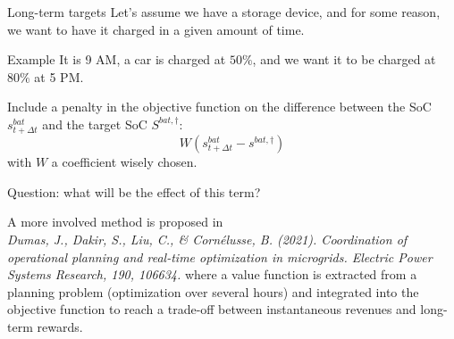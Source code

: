 \begin{frame}[allowframebreaks]{Long-term targets}
    Let's assume we have a storage device, and for some reason, we want to have it charged in a given amount of time.
    \begin{block}{Example}
        It is 9 AM, a car is charged at $50\%$, and we want it to be charged at $80\%$ at 5 PM.
    \end{block}

    Include a penalty in the objective function on the difference between the SoC $s^{bat}_{t+\Delta t}$ and the target SoC $S^{bat, \dagger}$:
    $$W (s^{bat}_{t+\Delta t} - s^{bat, \dagger})$$
    with $W$ a coefficient wisely chosen.

    Question: what will be the effect of this term?

    A more involved method is proposed in \\
    \textit{Dumas, J., Dakir, S., Liu, C., \& Cornélusse, B. (2021). Coordination of operational planning and real-time optimization in microgrids. Electric Power Systems Research, 190, 106634.}
    where a value function is extracted from a planning problem (optimization over several hours) and integrated into the objective function to reach a trade-off between instantaneous revenues and long-term rewards.
\end{frame}


